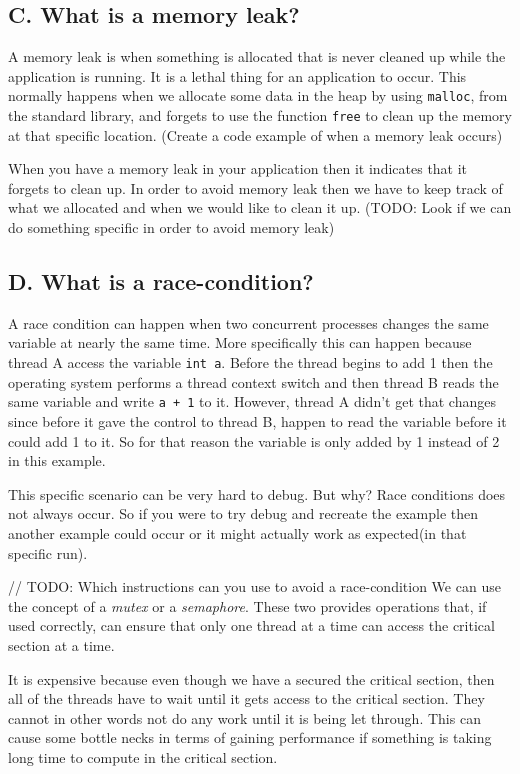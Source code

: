\documentclass[11pt]{article}
\newcommand{\code}[1]{{\colorbox{lightgray!15}{\color{orange}\texttt{#1}}}}
\newcommand{\temp}[1]{{\color{red}#1}}
\begin{document}
\subsection{C. What is a memory leak?}
A memory leak is when something is allocated that is never cleaned up while the application is running. 
It is a lethal thing for an application to occur. This normally happens when we allocate some data in the heap
by using \code{malloc}, from the standard library, and forgets to use the function \code{free} to clean up the memory
at that specific location. \temp{(Create a code example of when a memory leak occurs)}

When you have a memory leak in your application then it indicates that it forgets to clean up.
In order to avoid memory leak then we have to keep track of what we allocated and when we would like to clean it up.
\temp{(TODO: Look if we can do something specific in order to avoid memory leak)}

\subsection{D. What is a race-condition?}
A race condition can happen when two concurrent processes changes the same variable at nearly the same time. 
More specifically this can happen because thread A access the variable \code{int a}. Before the thread begins to add 1 then the operating system performs a thread context switch and then thread B reads the same variable and write \code{a + 1} to it.
However, thread A didn't get that changes since before it gave the control to thread B, happen to read the variable before it could add 1 to it. So for that reason the variable is only added by 1 instead of 2 in this example.

This specific scenario can be very hard to debug. But why? Race conditions does not always occur. So if you were to try debug and recreate the example then another example could occur or it might actually work as expected(in that specific run).

// TODO: Which instructions can you use to avoid a race-condition
We can use the concept of a \textit{mutex} or a \textit{semaphore}. These two provides operations that, if used correctly, can ensure that 
only one thread at a time can access the critical section at a time. 

It is expensive because even though we have a secured the critical section, then all of the threads have to wait until it gets access to
the critical section. They cannot in other words not do any work until it is being let through. This can cause some bottle necks in terms of 
gaining performance if something is taking long time to compute in the critical section.
\end{document}
